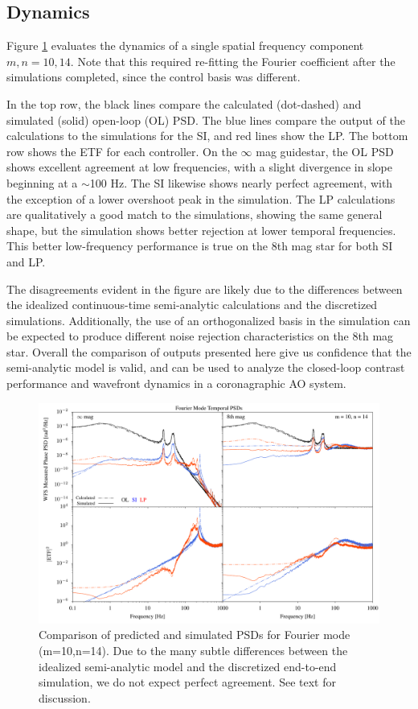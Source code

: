 \documentclass[11pt,preprint]{aastex}
\begin{document}
\subsection{Dynamics}
Figure \ref{fig:opd_psdcomp} evaluates the dynamics of a single spatial frequency component  $m,n = 10,14$.  Note that this required re-fitting the Fourier coefficient after the simulations completed, since the control basis was different.

In the top row, the black lines compare the calculated (dot-dashed) and simulated (solid) open-loop (OL) PSD.  The blue lines compare the output of the calculations to the simulations for the SI, and red lines show the LP.  The bottom row shows the ETF for each controller.  On the $\infty$ mag guidestar, the OL PSD shows excellent agreement at low frequencies, with a slight divergence in slope beginning at a $\sim$100 Hz. The SI likewise shows nearly perfect agreement, with the exception of a lower overshoot peak in the simulation.  The LP calculations are qualitatively a good match to the simulations, showing the same general shape, but the simulation shows better rejection at lower temporal frequencies.  This better low-frequency performance is true on the 8th mag star for both SI and LP.  

The disagreements evident in the figure are likely due to the differences between the idealized continuous-time semi-analytic calculations and the discretized simulations.  Additionally, the use of an orthogonalized basis in the simulation can be expected to produce different noise rejection characteristics on the 8th mag star.   Overall the comparison of outputs presented here give us confidence that the semi-analytic model is valid, and can be used to analyze the closed-loop contrast performance and wavefront dynamics in a coronagraphic AO system.

\begin{figure}
\hspace{-0.3in}
\includegraphics[width=6.5in]{psdcomp_10_14.pdf}
\caption{Comparison of predicted and simulated PSDs for Fourier mode (m=10,n=14).  Due to the many subtle differences between the idealized semi-analytic model and the discretized end-to-end simulation, we do not expect perfect agreement.  See text for discussion.    \label{fig:opd_psdcomp}}
\end{figure}
\end{document}
